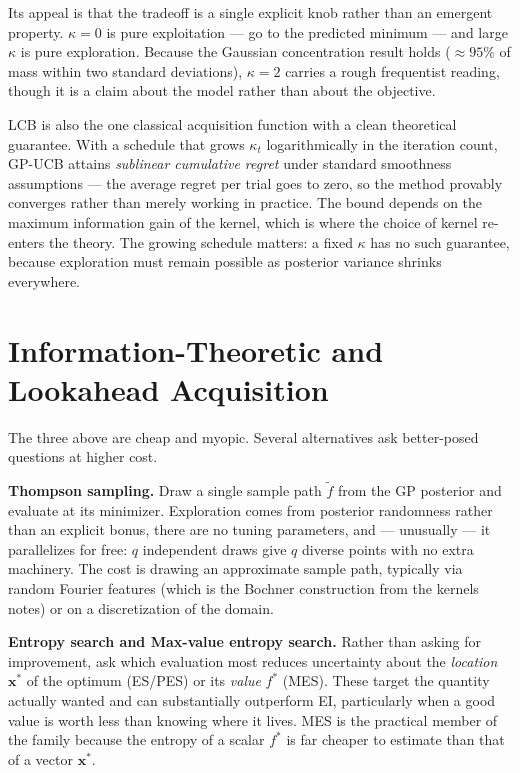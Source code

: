 \documentclass[conference]{IEEEtran}
\begin{document}
Its appeal is that the tradeoff is a single explicit knob rather than an emergent property. $\kappa = 0$ is pure exploitation --- go to the predicted minimum --- and large $\kappa$ is pure exploration. Because the Gaussian concentration result holds ($\approx 95\%$ of mass within two standard deviations), $\kappa = 2$ carries a rough frequentist reading, though it is a claim about the model rather than about the objective.

LCB is also the one classical acquisition function with a clean theoretical guarantee. With a schedule that grows $\kappa_t$ logarithmically in the iteration count, GP-UCB attains \textit{sublinear cumulative regret} under standard smoothness assumptions --- the average regret per trial goes to zero, so the method provably converges rather than merely working in practice. The bound depends on the maximum information gain of the kernel, which is where the choice of kernel re-enters the theory. The growing schedule matters: a fixed $\kappa$ has no such guarantee, because exploration must remain possible as posterior variance shrinks everywhere.

\section*{Information-Theoretic and Lookahead Acquisition}
The three above are cheap and myopic. Several alternatives ask better-posed questions at higher cost.

\textbf{Thompson sampling.} Draw a single sample path $\tilde{f}$ from the GP posterior and evaluate at its minimizer. Exploration comes from posterior randomness rather than an explicit bonus, there are no tuning parameters, and --- unusually --- it parallelizes for free: $q$ independent draws give $q$ diverse points with no extra machinery. The cost is drawing an approximate sample path, typically via random Fourier features (which is the Bochner construction from the kernels notes) or on a discretization of the domain.

\textbf{Entropy search and Max-value entropy search.} Rather than asking for improvement, ask which evaluation most reduces uncertainty about the \textit{location} $\mathbf{x}^*$ of the optimum (ES/PES) or its \textit{value} $f^*$ (MES). These target the quantity actually wanted and can substantially outperform EI, particularly when a good value is worth less than knowing where it lives. MES is the practical member of the family because the entropy of a scalar $f^*$ is far cheaper to estimate than that of a vector $\mathbf{x}^*$.
\end{document}
